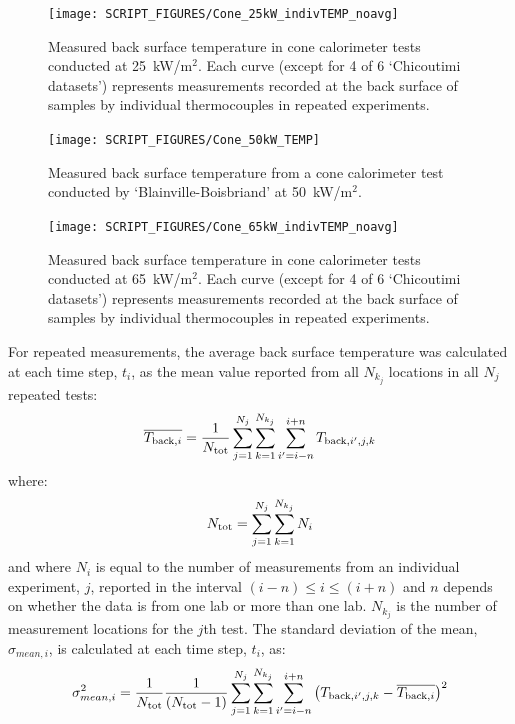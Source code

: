 \documentclass{book}
\begin{document}
\begin{figure}[p]
  \centering
  \texttt{[image: SCRIPT\_FIGURES/Cone\_25kW\_indivTEMP\_noavg]}
  \caption{Measured back surface temperature in cone calorimeter tests conducted at 25~kW/m$^2$. Each curve (except for 4 of 6 ‘Chicoutimi datasets’) represents measurements recorded at the back surface of samples by individual thermocouples in repeated experiments.}
  \label{Fig:Cone_25kWindivTEMP}
\end{figure}

\begin{figure}
  \centering
  \texttt{[image: SCRIPT\_FIGURES/Cone\_50kW\_TEMP]}
  \caption{Measured back surface temperature from a cone calorimeter test conducted by ‘Blainville-Boisbriand’ at 50~kW/m$^2$.}
  \label{Fig:Cone_50kWindivTEMP}
\end{figure}

\begin{figure}
  \centering
  \texttt{[image: SCRIPT\_FIGURES/Cone\_65kW\_indivTEMP\_noavg]}
  \caption{Measured back surface temperature in cone calorimeter tests conducted at 65~kW/m$^2$. Each curve (except for 4 of 6 ‘Chicoutimi datasets’) represents measurements recorded at the back surface of samples by individual thermocouples in repeated experiments.}
  \label{Fig:Cone_65kWindivTEMP}
\end{figure}


For repeated measurements, the average back surface temperature was calculated at each time step, $t_i$, as the mean value reported from all $N_{k_j}$ locations in all $N_j$ repeated tests:
\begin{equation}
  \overline{ T_{{\rm back},i} } = \frac{1}{N_{\rm tot}} \sum_{j=1}^{N_j} \sum_{k=1}^{N_{k_j}} \sum_{i'=i-n}^{i+n} T_{{\rm back},i',j,k} 
\end{equation}
where:
\begin{equation}
N_{\rm tot}={\sum_{j=1}^{N_j}\sum_{k=1}^{N_{k_j}}N_i}
\end{equation}
and where $N_i$ is equal to the number of measurements from an individual experiment, $j$, reported in the interval $(i-n) \leq i \leq (i+n)$ and $n$ depends on whether the data is from one lab or more than one lab. $N_{k_j}$ is the number of measurement locations for the $j$th test. The standard deviation of the mean, $\sigma_{mean,i}$, is calculated at each time step, $t_i$, as:
\begin{equation}
   \sigma_{mean,i}^2 = \frac{1}{N_{\rm tot}} \frac{1}{(N_{\rm tot}-1)}
    \sum_{j=1}^{N_j} \sum_{k=1}^{N_{k_j}} \sum_{i'=i-n}^{i+n} \left( T_{{\rm back},i',j,k} - \overline{ T_{{\rm back},i} }  \right)^2
\end{equation}
\end{document}
